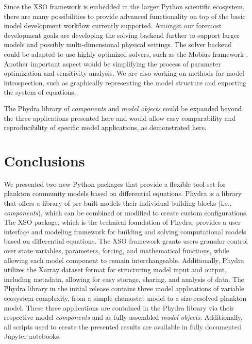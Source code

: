 \documentclass[gmd, manuscript]{copernicus}
\begin{document}
Since the XSO framework is embedded in the larger Python scientific ecosystem, there are many possibilities to provide advanced functionality on top of the basic model development workflow currently supported. Amongst our foremost development goals are developing the solving backend further to support larger models and possibly multi-dimensional physical settings. The solver backend could be adapted to use highly optimized solvers, such as the Mobius framework \citep{Norling2021RapidV1.0}. Another important aspect would be simplifying the process of parameter optimization and sensitivity analysis. We are also working on methods for model introspection, such as graphically representing the model structure and exporting the system of equations. 

The Phydra library of \textit{components} and \textit{model objects} could be expanded beyond the three applications presented here and would allow easy comparability and reproducibility of specific model applications, as demonstrated here.


\section{Conclusions}

We presented two new Python packages that provide a flexible tool-set for plankton community models based on differential equations. Phydra is a library that offers a library of pre-built models their individual building blocks (i.e., \textit{components}), which can be combined or modified to create custom configurations. The XSO package, which is the technical foundation of Phydra, provides a user interface and modeling framework for building and solving computational models based on differential equations. The XSO framework grants users granular control over state variables, parameters, forcing, and mathematical functions, while allowing each model component to remain interchangeable. Additionally, Phydra utilizes the Xarray dataset format for structuring model input and output, including metadata, allowing for easy storage, sharing, and analysis of data. The Phydra library in the initial release contains three model applications of variable ecosystem complexity, from a simple chemostat model to a size-resolved plankton model. These three applications are contained in the Phydra library via their respective model \textit{components} and as fully assembled \textit{model objects}. Additionally, all scripts used to create the presented results are available in fully documented Jupyter notebooks.
\end{document}
